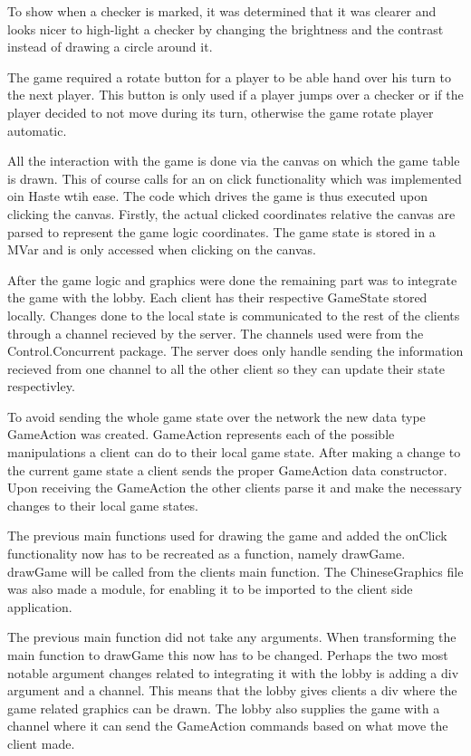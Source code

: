 \documentclass[a4paper]{article}
\begin{document}
To show when a checker is marked, it was determined that it was clearer and looks nicer to high-light a checker by changing the brightness and the contrast instead of drawing a circle around it.

The game required a rotate button for a player to be able hand over his turn to the next player. This button is only used if a player jumps over a checker or if the player decided to not move during its turn, otherwise the game rotate player automatic.

All the interaction with the game is done via the canvas on which the game table is drawn. This of course calls for an on click functionality which was
implemented oin Haste wtih ease. The code which drives the game is thus executed upon clicking the canvas. Firstly, the actual clicked coordinates relative the canvas are parsed to represent the game logic coordinates. The game state is stored in a MVar and is only accessed when clicking on the canvas.

After the game logic and graphics were done the remaining part was to integrate the game with the lobby. Each client has their respective GameState stored locally. Changes done to the local state is communicated to the rest of the clients through a channel recieved by the server. The channels used were from the Control.Concurrent package. The server does only handle sending the information recieved from one channel to all the other client so they can update their state respectivley.

To avoid sending the whole game state over the network the new data type GameAction was created. GameAction represents each of the possible manipulations a client can do to their local game state. After making a change to the current game state a client sends the proper GameAction data constructor. Upon receiving the GameAction the other clients parse it and make the necessary changes to their local game states.

The previous main functions used for drawing the game and added the onClick functionality now has to be recreated as a function, namely drawGame. drawGame will be called from the clients main function. The ChineseGraphics file was also
made a module, for enabling it to be imported to the client side application.

The previous main function did not take any arguments. When transforming the main function to drawGame this now has to be changed. Perhaps the two most notable argument changes related to integrating it with the lobby is
adding a div argument and a channel. This means that the lobby gives clients a div where the game related graphics can be drawn. The lobby also supplies the game with a channel where it can send the GameAction commands based on what move the client made.
\end{document}
